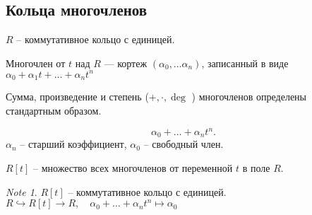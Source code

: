 \documentclass[11pt]{book}
\theoremstyle{definition}
\theoremstyle{plain}
\theoremstyle{plain}
\theoremstyle{definition}
\theoremstyle{remark}
\newtheorem*{note}{Note}
\begin{document}
 \subsection{Кольца многочленов}
     $ R$ -- коммутативное кольцо с единицей.
 \begin{defn}
     Многочлен от $ t$ над $ R$ --- кортеж $ ( \alpha _0, \ldots  \alpha _n)$, записанный в виде $ \alpha _0 + \alpha _1 t + \ldots + \alpha _n t^{n}$
 \end{defn}
 \begin{defn}
     Сумма, произведение и степень ($ +, \cdot , \deg$ ) многочленов определены стандартным образом.
 \end{defn}
 \begin{defn}
     \[
	 \alpha _0 + \ldots + \alpha _n t ^{n}
     .\] 
     $ \alpha _n$ -- старший коэффициент, 
     $ \alpha _0$ -- свободный член.

     $ R[t]$ -- множество всех многочленов от переменной $ t$ в поле $ R$. 
 \end{defn}
 \begin{note}
     $ R[t]$ -- коммутативное кольцо с единицей.
     $ R  \hookrightarrow  R[t] \to  R, \quad \alpha _0 + \ldots + \alpha _n t ^{n} \mapsto \alpha _0$
 \end{note}
\end{document}
